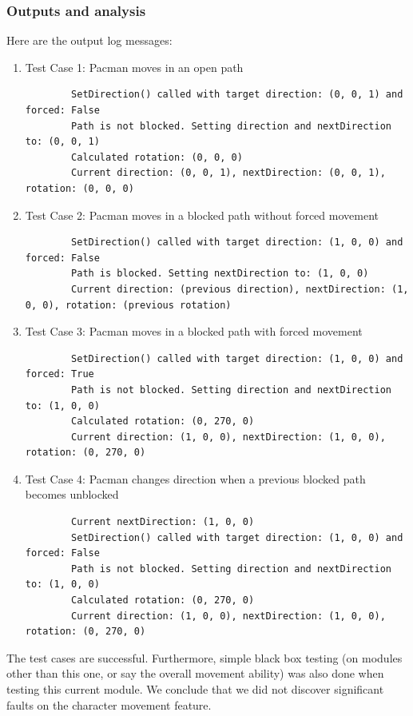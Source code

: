 \documentclass[11pt]{article}
\begin{document}
    \subsubsection*{Outputs and analysis}
    Here are the output log messages:

    \begin{enumerate}
        \item Test Case 1: Pacman moves in an open path
        \begin{lstlisting}
        SetDirection() called with target direction: (0, 0, 1) and forced: False
        Path is not blocked. Setting direction and nextDirection to: (0, 0, 1)
        Calculated rotation: (0, 0, 0)
        Current direction: (0, 0, 1), nextDirection: (0, 0, 1), rotation: (0, 0, 0)
        \end{lstlisting}

        \item Test Case 2: Pacman moves in a blocked path without forced movement
        \begin{lstlisting}
        SetDirection() called with target direction: (1, 0, 0) and forced: False
        Path is blocked. Setting nextDirection to: (1, 0, 0)
        Current direction: (previous direction), nextDirection: (1, 0, 0), rotation: (previous rotation)
        \end{lstlisting}

        \item Test Case 3: Pacman moves in a blocked path with forced movement
        \begin{lstlisting}
        SetDirection() called with target direction: (1, 0, 0) and forced: True
        Path is not blocked. Setting direction and nextDirection to: (1, 0, 0)
        Calculated rotation: (0, 270, 0)
        Current direction: (1, 0, 0), nextDirection: (1, 0, 0), rotation: (0, 270, 0)
        \end{lstlisting}

        \item Test Case 4: Pacman changes direction when a previous blocked path becomes unblocked
        \begin{lstlisting}
        Current nextDirection: (1, 0, 0)
        SetDirection() called with target direction: (1, 0, 0) and forced: False
        Path is not blocked. Setting direction and nextDirection to: (1, 0, 0)
        Calculated rotation: (0, 270, 0)
        Current direction: (1, 0, 0), nextDirection: (1, 0, 0), rotation: (0, 270, 0)
        \end{lstlisting}
    \end{enumerate}

    The test cases are successful. Furthermore, simple black box testing (on modules other than this one, or say the overall movement ability) was also done when testing this current module. We conclude that we did not discover significant faults on the character movement feature.
    
\end{document}
